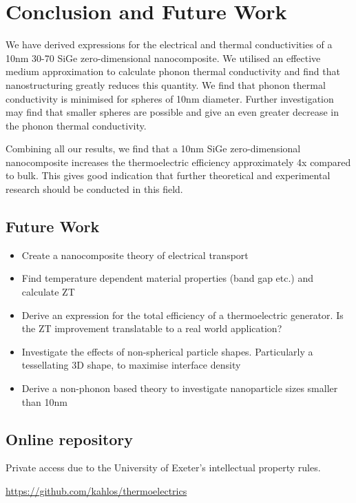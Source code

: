 \documentclass[12pt]{article}
\newcommand{\tms}{\textsf{x} }
\begin{document}
\pagebreak

\section{Conclusion and Future Work}
We have derived expressions for the electrical and thermal conductivities of a 10nm 30-70 SiGe zero-dimensional nanocomposite. We utilised an effective medium approximation to calculate phonon thermal conductivity and find that nanostructuring greatly reduces this quantity. We find that phonon thermal conductivity is minimised for spheres of 10nm diameter. Further investigation may find that smaller spheres are possible and give an even greater decrease in the phonon thermal conductivity.

Combining all our results, we find that a 10nm SiGe zero-dimensional nanocomposite increases the thermoelectric efficiency approximately 4\tms compared to bulk. This gives good indication that further theoretical and experimental research should be conducted in this field.

\subsection{Future Work}
\begin{itemize}
  \item Create a nanocomposite theory of electrical transport
  \item Find temperature dependent material properties (band gap etc.) and calculate ZT
  \item Derive an expression for the total efficiency of a thermoelectric generator. Is the ZT improvement translatable to a real world application?
  \item Investigate the effects of non-spherical particle shapes. Particularly a tessellating 3D shape, to maximise interface density
  \item Derive a non-phonon based theory to investigate nanoparticle sizes smaller than 10nm
\end{itemize}

\subsection{Online repository}
Private access due to the University of Exeter's intellectual property rules.

\url{https://github.com/kahlos/thermoelectrics}
\end{document}
